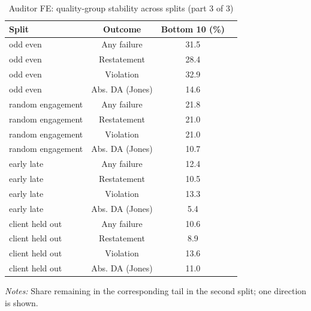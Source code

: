 \begin{table}[htbp]
\footnotesize
\centering
\caption{Auditor FE: quality-group stability across splits (part 3 of 3)}
\begin{threeparttable}
\begin{tabular}{p{}ccc}
\toprule
Split & Outcome & Bottom 10 (\%) &  \\
\midrule
odd even & Any failure & 31.5 &  \\
odd even & Restatement & 28.4 &  \\
odd even & Violation & 32.9 &  \\
odd even & Abs. DA (Jones) & 14.6 &  \\
random engagement & Any failure & 21.8 &  \\
random engagement & Restatement & 21.0 &  \\
random engagement & Violation & 21.0 &  \\
random engagement & Abs. DA (Jones) & 10.7 &  \\
early late & Any failure & 12.4 &  \\
early late & Restatement & 10.5 &  \\
early late & Violation & 13.3 &  \\
early late & Abs. DA (Jones) & 5.4 &  \\
client held out & Any failure & 10.6 &  \\
client held out & Restatement & 8.9 &  \\
client held out & Violation & 13.6 &  \\
client held out & Abs. DA (Jones) & 11.0 &  \\
\bottomrule
\end{tabular}
\begin{tablenotes}\footnotesize
\item \raggedright \textit{Notes:} Share remaining in the corresponding tail in the second split; one direction is shown.
\end{tablenotes}
\end{threeparttable}
\end{table}
